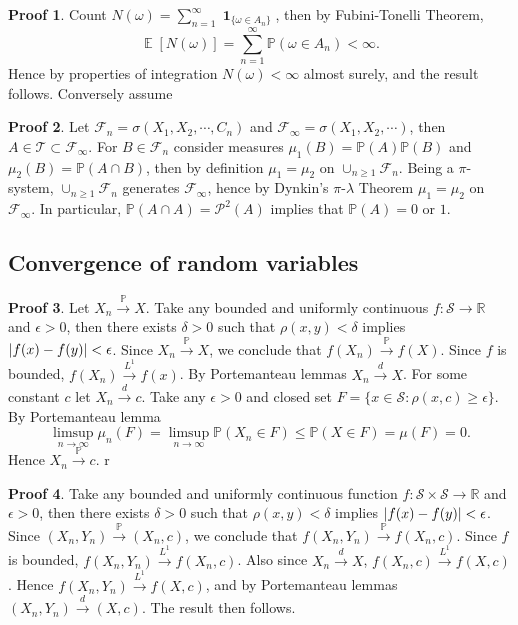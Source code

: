 \documentclass[hidelinks,11pt]{article}
\theoremstyle{definition}
\theoremstyle{dotless}
\newtheorem{prop}{Proof}[section]
\theoremstyle{remark}
\DeclareMathOperator{\E}{\mathbb{E}}
\DeclareMathOperator{\1}{\mathbf{1}}
\begin{document}
\begin{prop}
Count $N(\omega)=\sum_{n=1}^\infty\1_{\{\omega\in A_n\}}$, then by Fubini-Tonelli Theorem,
\[\E[N(\omega)]=\sum_{n=1}^\infty\mathbb{P}(\omega\in A_n)<\infty.\] Hence by properties of integration $N(\omega)<\infty$ almost surely, and the result follows.\medbreak
Conversely assume
\end{prop}

\begin{prop}
Let $\mathcal{F}_n=\sigma(X_1,X_2,\cdots,C_n)$ and $\mathcal{F}_\infty=\sigma(X_1,X_2,\cdots)$, then $A\in\mathcal{T}\subset\mathcal{F}_\infty$. For $B\in\mathcal{F}_n$ consider measures $\mu_1(B)=\mathbb{P}(A)\mathbb{P}(B)$ and $\mu_2(B)=\mathbb{P}(A\cap B)$, then by definition $\mu_1=\mu_2$ on $\cup_{n\geq1}\mathcal{F}_n$. Being a $\pi$-system, $\cup_{n\geq1}\mathcal{F}_n$ generates $\mathcal{F}_\infty$, hence by Dynkin's $\pi$-$\lambda$ Theorem $\mu_1=\mu_2$ on $\mathcal{F}_\infty$. In particular, $\mathbb{P}(A\cap A)=\mathcal{P}^2(A)$ implies that $\mathbb{P}(A)=0$ or $1$.
\end{prop}

\subsection{Convergence of random variables}

\begin{prop}
Let $X_n\xrightarrow{\mathbb{P}}X$. Take any bounded and uniformly continuous $f:\mathcal{S}\to\mathbb{R}$ and $\epsilon>0$, then there exists $\delta>0$ such that $\rho(x,y)<\delta$ implies $\abs{f(x)-f(y)}<\epsilon$. Since $X_n\xrightarrow{\mathbb{P}}X$, we conclude that $f(X_n)\xrightarrow{\mathbb{P}}f(X)$. Since $f$ is bounded, $f(X_n)\xrightarrow{L^1}f(x)$. By Portemanteau lemmas $X_n\xrightarrow{d}X$.\medbreak
For some constant $c$ let $X_n\xrightarrow{d}c$. Take any $\epsilon>0$ and closed set $F=\{x\in\mathcal{S}:\rho(x,c)\geq\epsilon\}$. By Portemanteau lemma
\[\limsup_{n\to\infty}\mu_n(F)=\limsup_{n\to\infty}\mathbb{P}(X_n\in F)\leq\mathbb{P}(X\in F)=\mu(F)=0.\]
Hence $X_n\xrightarrow{\mathbb{P}}c$.\medbreak
r
\end{prop}

\begin{prop}
Take any bounded and uniformly continuous function $f:\mathcal{S}\times\mathcal{S}\to\mathbb{R}$ and $\epsilon>0$, then there exists $\delta>0$ such that $\rho(x,y)<\delta$ implies $\abs{f(x)-f(y)}<\epsilon$. Since $(X_n,Y_n)\xrightarrow{\mathbb{P}}(X_n,c)$, we conclude that $f(X_n,Y_n)\xrightarrow{\mathbb{P}}f(X_n,c)$. Since $f$ is bounded, $f(X_n,Y_n)\xrightarrow{L^1}f(X_n,c)$. Also since $X_n\xrightarrow{d}X$, $f(X_n,c)\xrightarrow{L^1}f(X,c)$. Hence $f(X_n,Y_n)\xrightarrow{L^1}f(X,c)$, and by Portemanteau lemmas $(X_n,Y_n)\xrightarrow{d}(X,c)$. The result then follows.
\end{prop}
\end{document}
